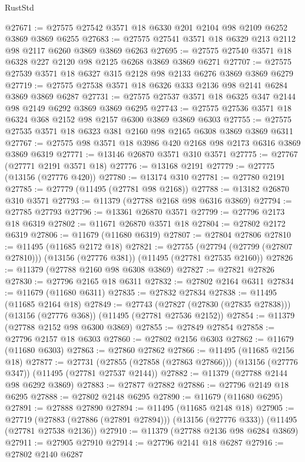 \begin{lexlean}{RustStd}
\begin{coremodule}
@27671 := @27575 @27542 @3571 @18 @6330 @201 @2104 @98 @2109 @6252 @3869 @3869 @6255
@27683 := @27575 @27541 @3571 @18 @6329 @213 @2112 @98 @2117 @6260 @3869 @3869 @6263
@27695 := @27575 @27540 @3571 @18 @6328 @227 @2120 @98 @2125 @6268 @3869 @3869 @6271
@27707 := @27575 @27539 @3571 @18 @6327 @315 @2128 @98 @2133 @6276 @3869 @3869 @6279
@27719 := @27575 @27538 @3571 @18 @6326 @333 @2136 @98 @2141 @6284 @3869 @3869 @6287
@27731 := @27575 @27537 @3571 @18 @6325 @347 @2144 @98 @2149 @6292 @3869 @3869 @6295
@27743 := @27575 @27536 @3571 @18 @6324 @368 @2152 @98 @2157 @6300 @3869 @3869 @6303
@27755 := @27575 @27535 @3571 @18 @6323 @381 @2160 @98 @2165 @6308 @3869 @3869 @6311
@27767 := @27575 @98 @3571 @18 @3986 @420 @2168 @98 @2173 @6316 @3869 @3869 @6319
@27771 := @13146 @26870 @3571 @310 @3571
@27775 := @27767 (@27771 @2191 @3571 @18)
@27776 := @13168 @2191
@27779 := @27775 (@13156 (@27776 @420))
@27780 := @13174 @310
@27781 := @27780 @2191
@27785 := @27779 (@11495 (@27781 @98 @2168))
@27788 := @13182 @26870 @310 @3571
@27793 := @11379 (@27788 @2168 @98 @6316 @3869)
@27794 := @27785 @27793
@27796 := @13361 @26870 @3571
@27799 := @27796 @2173 @18 @6319
@27802 := @11671 @26870 @3571 @18
@27804 := @27802 @2172 @6319
@27806 := @11679 (@11680 @6319)
@27807 := @27804 @27806
@27810 := @11495 (@11685 @2172 @18)
@27821 := @27755
    (@27794 (@27799 (@27807 @27810)))
    (@13156 (@27776 @381))
    (@11495 (@27781 @27535 @2160))
@27826 := @11379 (@27788 @2160 @98 @6308 @3869)
@27827 := @27821 @27826
@27830 := @27796 @2165 @18 @6311
@27832 := @27802 @2164 @6311
@27834 := @11679 (@11680 @6311)
@27835 := @27832 @27834
@27838 := @11495 (@11685 @2164 @18)
@27849 := @27743
    (@27827 (@27830 (@27835 @27838)))
    (@13156 (@27776 @368))
    (@11495 (@27781 @27536 @2152))
@27854 := @11379 (@27788 @2152 @98 @6300 @3869)
@27855 := @27849 @27854
@27858 := @27796 @2157 @18 @6303
@27860 := @27802 @2156 @6303
@27862 := @11679 (@11680 @6303)
@27863 := @27860 @27862
@27866 := @11495 (@11685 @2156 @18)
@27877 := @27731
    (@27855 (@27858 (@27863 @27866)))
    (@13156 (@27776 @347))
    (@11495 (@27781 @27537 @2144))
@27882 := @11379 (@27788 @2144 @98 @6292 @3869)
@27883 := @27877 @27882
@27886 := @27796 @2149 @18 @6295
@27888 := @27802 @2148 @6295
@27890 := @11679 (@11680 @6295)
@27891 := @27888 @27890
@27894 := @11495 (@11685 @2148 @18)
@27905 := @27719
    (@27883 (@27886 (@27891 @27894)))
    (@13156 (@27776 @333))
    (@11495 (@27781 @27538 @2136))
@27910 := @11379 (@27788 @2136 @98 @6284 @3869)
@27911 := @27905 @27910
@27914 := @27796 @2141 @18 @6287
@27916 := @27802 @2140 @6287

\end{coremodule}
\end{lexlean}

